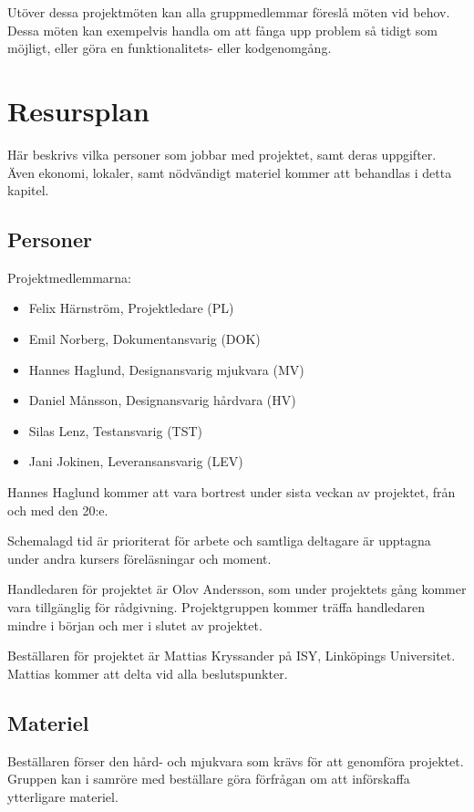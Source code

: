 \documentclass[a4paper,11pt]{article}
\newcommand{\LIPShandledare}{Olov Andersson}
\begin{document}
Utöver dessa projektmöten kan alla gruppmedlemmar föreslå möten vid behov. Dessa möten kan exempelvis handla om att fånga upp problem så tidigt som möjligt, eller göra en funktionalitets- eller kodgenomgång.

\section{Resursplan}
Här beskrivs vilka personer som jobbar med projektet, samt deras uppgifter. Även ekonomi, lokaler, samt nödvändigt materiel kommer att behandlas i detta kapitel.

\subsection{Personer}
Projektmedlemmarna:
\begin{itemize}
	\item Felix Härnström, Projektledare (PL)
	\item Emil Norberg, Dokumentansvarig (DOK)
	\item Hannes Haglund, Designansvarig mjukvara (MV)
	\item Daniel Månsson, Designansvarig hårdvara (HV)
	\item Silas Lenz, Testansvarig (TST)
	\item Jani Jokinen, Leveransansvarig (LEV)
\end{itemize}
Hannes Haglund kommer att vara bortrest under sista veckan av projektet, från och med den 20:e.

Schemalagd tid är prioriterat för arbete och samtliga deltagare är upptagna under andra kursers föreläsningar och moment.

Handledaren för projektet är \LIPShandledare , som under projektets gång kommer vara tillgänglig för rådgivning. Projektgruppen kommer träffa handledaren mindre i början och mer i slutet av projektet.

Beställaren för projektet är  Mattias Kryssander på ISY, Linköpings Universitet. Mattias kommer att delta vid alla beslutspunkter.

\subsection{Materiel}
Beställaren förser den hård- och mjukvara som krävs för att genomföra projektet. Gruppen kan i samröre med beställare göra förfrågan om att införskaffa ytterligare materiel. 
\end{document}
